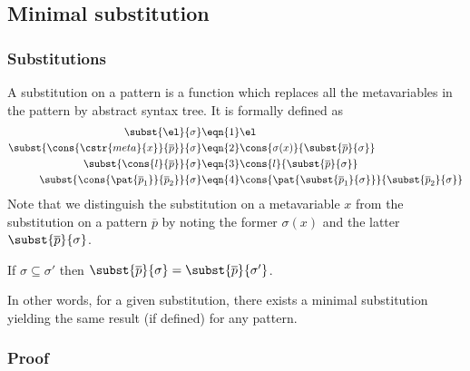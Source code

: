 
\subsection{Minimal substitution}

\subsubsection{Substitutions}

A substitution on a pattern is a function which replaces all the
meta\-variables in the pattern by abstract syntax tree. It is
formally defined as
\begin{align*}
  \subst{\el}{\sigma} 
&\eqn{1} \el\\
  \subst{\cons{\cstr{meta}{x}}{\overline{p}}}{\sigma}
&\eqn{2} \cons{\sigma(x)}{\subst{\overline{p}}{\sigma}}\\
  \subst{\cons{l}{\overline{p}}}{\sigma}
&\eqn{3} \cons{l}{\subst{\overline{p}}{\sigma}}\\
  \subst{\cons{\pat{\overline{p}_1}}{\overline{p}_2}}{\sigma}
&\eqn{4}
  \cons{\pat{\subst{\overline{p}_1}{\sigma}}}%
       {\subst{\overline{p}_2}{\sigma}}
\end{align*}
Note that we distinguish the substitution on a meta\-variable
\(x\) from the substitution on a pattern \(\overline{p}\) by noting
the former \(\sigma(x)\) and the latter
\(\subst{\overline{p}}{\sigma}\).

\begin{thm}[Minimality]\hfill
\label{minimality_proof}
\begin{center}
If \(\sigma \subseteq \sigma'\) 
then \(\subst{\overline{p}}{\sigma} = \subst{\overline{p}}{\sigma'}\).
\end{center}
\end{thm}
\noindent In other words, for a given substitution, there exists a
minimal substitution yielding the same result (if defined) for any
pattern.

\subsubsection{Proof}


